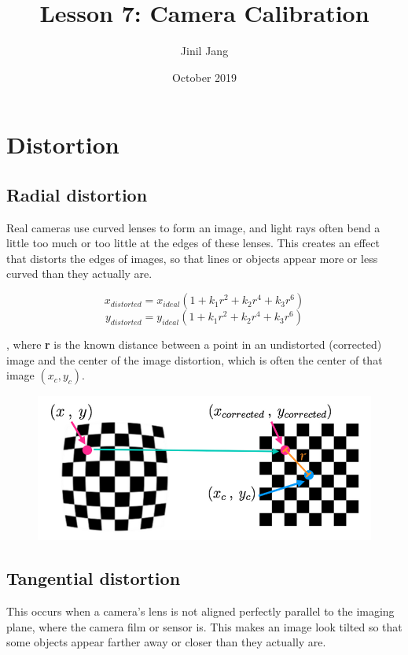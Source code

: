 \documentclass[12pt]{article}
\title{Lesson 7: Camera Calibration}
\author{Jinil Jang }
\date{October 2019}
\begin{document}
\maketitle

\section{Distortion}

\subsection{Radial distortion}

Real cameras use curved lenses to form an image, and light rays often bend a little too much or too little at the edges of these lenses. This creates an effect that distorts the edges of images, so that lines or objects appear more or less curved than they actually are.

\[x_{distorted} = x_{ideal}(1 + k_1r^2 + k_2r^4 + k_3r^6)\]
\[y_{distorted} = y_{ideal}(1 + k_1r^2 + k_2r^4 + k_3r^6)\]

, where \textbf{r} is the known distance between a point in an undistorted (corrected) image and the center of the image distortion, which is often the center of that image $(x_c, y_c)$.

\begin{figure}[htp]
    \centering
    \includegraphics[width=15cm]{distortion.png}
    \label{fig:distortion}
\end{figure}

\subsection{Tangential distortion}

This occurs when a camera’s lens is not aligned perfectly parallel to the imaging plane, where the camera film or sensor is. This makes an image look tilted so that some objects appear farther away or closer than they actually are.
\end{document}
